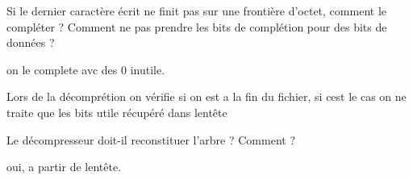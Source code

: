 \begin{DoxyItemize}
\item Si le dernier caractère écrit ne finit pas sur une frontière d’octet, comment le compléter ? Comment ne pas prendre les bits de complétion pour des bits de données ?
\begin{DoxyItemize}
\item on le complete avc des 0 inutile.
\item Lors de la décomprétion on vérifie si on est a la fin du fichier, si c\textquotesingle{}est le cas on ne traite que les bits utile récupéré dans l\textquotesingle{}entête
\end{DoxyItemize}
\item Le décompresseur doit-\/il reconstituer l’arbre ? Comment ?
\begin{DoxyItemize}
\item oui, a partir de l\textquotesingle{}entête. 
\end{DoxyItemize}
\end{DoxyItemize}